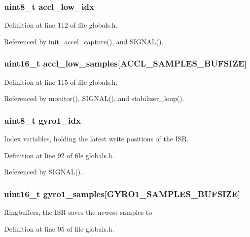 \subsubsection{\setlength{\rightskip}{0pt plus 5cm}uint8\_\-t {\bf accl\_\-low\_\-idx}}\label{group__ro__globals_gc68711930c7bd1daaeec498ba9bb3ca7}




Definition at line 112 of file globals.h.

Referenced by init\_\-accel\_\-capture(), and SIGNAL().
\subsubsection{\setlength{\rightskip}{0pt plus 5cm}uint16\_\-t {\bf accl\_\-low\_\-samples}[ACCL\_\-SAMPLES\_\-BUFSIZE]}\label{group__ro__globals_g82b3b9358d663fddd337464079cb201c}




Definition at line 115 of file globals.h.

Referenced by monitor(), SIGNAL(), and stabilizer\_\-loop().
\subsubsection{\setlength{\rightskip}{0pt plus 5cm}uint8\_\-t {\bf gyro1\_\-idx}}\label{group__ro__globals_gfab9254be95380573eb12316b366027b}


Index variables, holding the latest write positions of the ISR. 

Definition at line 92 of file globals.h.

Referenced by SIGNAL().
\subsubsection{\setlength{\rightskip}{0pt plus 5cm}uint16\_\-t {\bf gyro1\_\-samples}[GYRO1\_\-SAMPLES\_\-BUFSIZE]}\label{group__ro__globals_gdf431d8f8d0d2f01f1ab06accecf8424}


Ringbuffers, the ISR saves the newest samples to 

Definition at line 95 of file globals.h.


